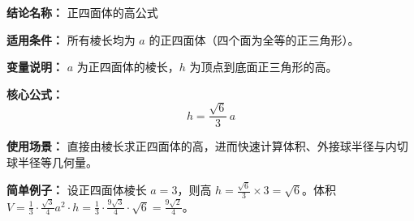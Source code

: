 \textbf{结论名称：} 正四面体的高公式

\textbf{适用条件：} 所有棱长均为 \(a\) 的正四面体（四个面为全等的正三角形）。

\textbf{变量说明：} \(a\) 为正四面体的棱长，\(h\) 为顶点到底面正三角形的高。

\textbf{核心公式：} 
\[
\boxed{h = \frac{\sqrt{6}}{3}\,a}
\]

\textbf{使用场景：} 直接由棱长求正四面体的高，进而快速计算体积、外接球半径与内切球半径等几何量。

\textbf{简单例子：} 设正四面体棱长 \(a=3\)，则高 \(h = \frac{\sqrt{6}}{3}\times 3 = \sqrt{6}\)。体积 
\( V = \frac{1}{3}\cdot\frac{\sqrt{3}}{4}a^{2}\cdot h = \frac{1}{3}\cdot\frac{9\sqrt{3}}{4}\cdot\sqrt{6} = \frac{9\sqrt{2}}{4}\)。